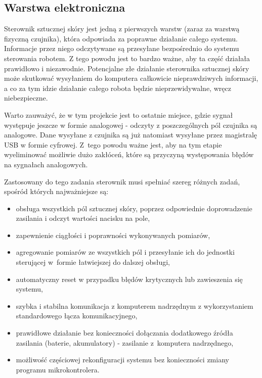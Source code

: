 \subsection{Warstwa elektroniczna}
\label{ss_budowa_ele}

Sterownik sztucznej skóry jest jedną z pierwszych warstw (zaraz za warstwą fizyczną czujnika), która odpowiada za poprawne działanie całego systemu. Informacje przez niego odczytywane są przesyłane bezpośrednio do systemu sterowania robotem. Z tego powodu jest to bardzo ważne, aby ta część działała prawidłowo i niezawodnie. Potencjalne złe działanie sterownika sztucznej skóry może skutkować wysyłaniem do komputera całkowicie nieprawdziwych informacji, a co za tym idzie działanie całego robota będzie nieprzewidywalne, wręcz niebezpieczne.

Warto zauważyć, że w tym projekcie jest to ostatnie miejsce, gdzie sygnał występuje jeszcze w formie analogowej - odczyty z poszczególnych pól czujnika są analogowe. Dane wysyłane z czujnika są już natomiast wysyłane przez magistralę USB w formie cyfrowej. Z~tego powodu ważne jest, aby na tym etapie wyeliminować możliwie dużo zakłóceń, które są przyczyną występowania błędów na sygnałach analogowych.

Zastosowany do tego zadania sterownik musi spełniać szereg różnych zadań, spośród których najważniejsze są:
\begin{itemize}
    \item obsługa wszystkich pól sztucznej skóry, poprzez odpowiednie doprowadzenie zasilania i odczyt wartości nacisku na pole,
    \item zapewnienie ciągłości i poprawności wykonywanych pomiarów,
    \item agregowanie pomiarów ze wszystkich pól i przesyłanie ich do jednostki sterującej w~formie łatwiejszej do dalszej obsługi,
    \item automatyczny reset w przypadku błędów krytycznych lub zawieszenia się systemu,
    \item szybka i stabilna komunikacja z komputerem nadrzędnym z wykorzystaniem standardowego łącza komunikacyjnego,
    \item prawidłowe działanie bez konieczności dołączania dodatkowego źródła zasilania (baterie, akumulatory) - zasilanie z~komputera nadrzędnego,
    \item możliwość częściowej rekonfiguracji systemu bez konieczności zmiany programu mikrokontrolera.
\end{itemize}

